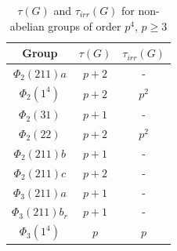 \documentclass[a4paper,11pt]{amsart}
\numberwithin{equation}{section}
\numberwithin{equation}{subsection}
\begin{document}
\begin{table}[!hbt]
\centering
\small
\begin{tabular}{|c|c|c|}
	\hline
	Group & $\tau(G)$ & $\tau_{irr}(G)$ \\
	\hline
	$\Phi_{2}(211)a$ & $p+2$ & - \\
	$\Phi_{2}(1^{4})$ & $p+2$ & $p^2$ \\
	$\Phi_{2}(31)$ & $p+1$ & - \\
	$\Phi_{2}(22)$ & $p+2$ & $p^2$ \\
	$\Phi_{2}(211)b$ & $p+1$ & -\\
	$\Phi_{2}(211)c$ & $p+2$ & - \\
	$\Phi_{3}(211)a$ & $p+1$ & -\\
	$\Phi_{3}(211)b_{r}$ & $p+1$ & -\\
	$\Phi_{3}(1^{4})$ & $p$ & $p$ \\
	\hline
\end{tabular}
\caption{$\tau(G)$ and $\tau_{irr}(G)$ for non-abelian groups of order $p^4$, $p \geq 3$} %
\end{table}
\end{document}

